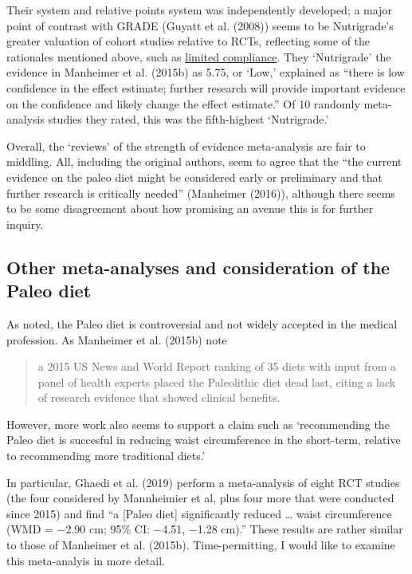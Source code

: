 \documentclass[]{tufte-handout}
\begin{document}

Their system and relative points system was independently developed; a
major point of contrast with GRADE (Guyatt et al. (2008)) seems to be
Nutrigrade's greater valuation of cohort studies relative to RCTs,
reflecting some of the rationales mentioned above, such as
\protect\hyperlink{compliance}{limited compliance}. They `Nutrigrade'
the evidence in Manheimer et al. (2015b) as 5.75, or `Low,' explained as
``there is low confidence in the effect estimate; further research will
provide important evidence on the confidence and likely change the
effect estimate.'' Of 10 randomly meta-analysis studies they rated, this
was the fifth-highest `Nutrigrade.'

Overall, the `reviews' of the strength of evidence meta-analysis are
fair to middling. All, including the original authors, seem to agree
that the ``the current evidence on the paleo diet might be considered
early or preliminary and that further research is critically needed''
(Manheimer (2016)), although there seems to be some disagreement about
how promising an avenue this is for further inquiry.

\hypertarget{other-meta-analyses-and-consideration-of-the-paleo-diet}{%
\subsection{Other meta-analyses and consideration of the Paleo
diet}\label{other-meta-analyses-and-consideration-of-the-paleo-diet}}

As noted, the Paleo diet is controversial and not widely accepted in the
medical profession. As Manheimer et al. (2015b) note

\begin{quote}
a 2015 US News and World Report ranking of 35 diets with input from a
panel of health experts placed the Paleolithic diet dead last, citing a
lack of research evidence that showed clinical benefits.
\end{quote}

However, more work also seems to support a claim such as `recommending
the Paleo diet is succesful in reducing waist circumference in the
short-term, relative to recommending more traditional diets.'

In particular, Ghaedi et al. (2019) perform a meta-analysis of eight RCT
studies (the four considered by Mannheimier et al, plus four more that
were conducted since 2015) and find ``a {[}Paleo diet{]} significantly
reduced \ldots{} waist circumference (WMD = −2.90 cm; 95\% CI: −4.51,
−1.28 cm).'' These results are rather similar to those of Manheimer et
al. (2015b). Time-permitting, I would like to examine this meta-analyis
in more detail.
\end{document}

